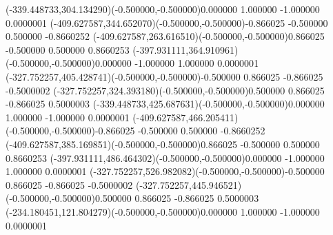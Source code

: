 \color{ASYcolor}
\fontsize{12.000000}{14.400000}\selectfont
\ASYalignT(-339.448733,304.134290)(-0.500000,-0.500000){0.000000 1.000000 -1.000000 0.000000}{1}%
\color{ASYcolor}
\fontsize{12.000000}{14.400000}\selectfont
\ASYalignT(-409.627587,344.652070)(-0.500000,-0.500000){-0.866025 -0.500000 0.500000 -0.866025}{2}%
\color{ASYcolor}
\fontsize{12.000000}{14.400000}\selectfont
\ASYalignT(-409.627587,263.616510)(-0.500000,-0.500000){0.866025 -0.500000 0.500000 0.866025}{3}%
\color{ASYcolor}
\fontsize{12.000000}{14.400000}\selectfont
\ASYalignT(-397.931111,364.910961)(-0.500000,-0.500000){0.000000 -1.000000 1.000000 0.000000}{1}%
\color{ASYcolor}
\fontsize{12.000000}{14.400000}\selectfont
\ASYalignT(-327.752257,405.428741)(-0.500000,-0.500000){-0.500000 0.866025 -0.866025 -0.500000}{2}%
\color{ASYcolor}
\fontsize{12.000000}{14.400000}\selectfont
\ASYalignT(-327.752257,324.393180)(-0.500000,-0.500000){0.500000 0.866025 -0.866025 0.500000}{3}%
\color{ASYcolor}
\fontsize{12.000000}{14.400000}\selectfont
\ASYalignT(-339.448733,425.687631)(-0.500000,-0.500000){0.000000 1.000000 -1.000000 0.000000}{1}%
\color{ASYcolor}
\fontsize{12.000000}{14.400000}\selectfont
\ASYalignT(-409.627587,466.205411)(-0.500000,-0.500000){-0.866025 -0.500000 0.500000 -0.866025}{2}%
\color{ASYcolor}
\fontsize{12.000000}{14.400000}\selectfont
\ASYalignT(-409.627587,385.169851)(-0.500000,-0.500000){0.866025 -0.500000 0.500000 0.866025}{3}%
\color{ASYcolor}
\fontsize{12.000000}{14.400000}\selectfont
\ASYalignT(-397.931111,486.464302)(-0.500000,-0.500000){0.000000 -1.000000 1.000000 0.000000}{1}%
\color{ASYcolor}
\fontsize{12.000000}{14.400000}\selectfont
\ASYalignT(-327.752257,526.982082)(-0.500000,-0.500000){-0.500000 0.866025 -0.866025 -0.500000}{2}%
\color{ASYcolor}
\fontsize{12.000000}{14.400000}\selectfont
\ASYalignT(-327.752257,445.946521)(-0.500000,-0.500000){0.500000 0.866025 -0.866025 0.500000}{3}%
\color{ASYcolor}
\fontsize{12.000000}{14.400000}\selectfont
\ASYalignT(-234.180451,121.804279)(-0.500000,-0.500000){0.000000 1.000000 -1.000000 0.000000}{1}%
\color{ASYcolor}
